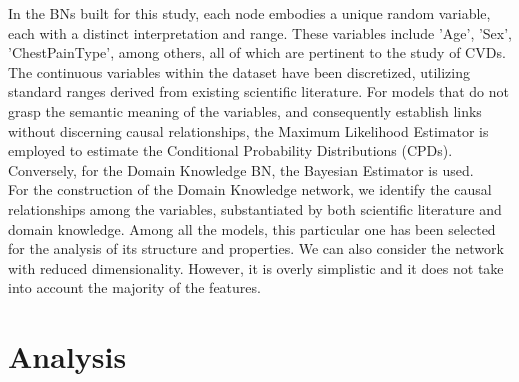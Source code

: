 \documentclass[letterpaper]{article}
\begin{document}

In the BNs built for this study, each node embodies a unique random variable, each with a distinct interpretation and range. These variables include 'Age', 'Sex', 'ChestPainType', among others, all of which are pertinent to the study of CVDs. The continuous variables within the dataset have been discretized, utilizing standard ranges derived from existing scientific literature. For models that do not grasp the semantic meaning of the variables, and consequently establish links without discerning causal relationships, the Maximum Likelihood Estimator is employed to estimate the Conditional Probability Distributions (CPDs). Conversely, for the Domain Knowledge BN, the Bayesian Estimator is used.\\
For the construction of the Domain Knowledge network, we identify the causal relationships among the variables, substantiated by both scientific literature and domain knowledge. Among all the models, this particular one has been selected for the analysis of its structure and properties.
We can also consider the network with reduced dimensionality. However, it is overly simplistic and it does not take into account the majority of the features.

\section{Analysis}
\end{document}

